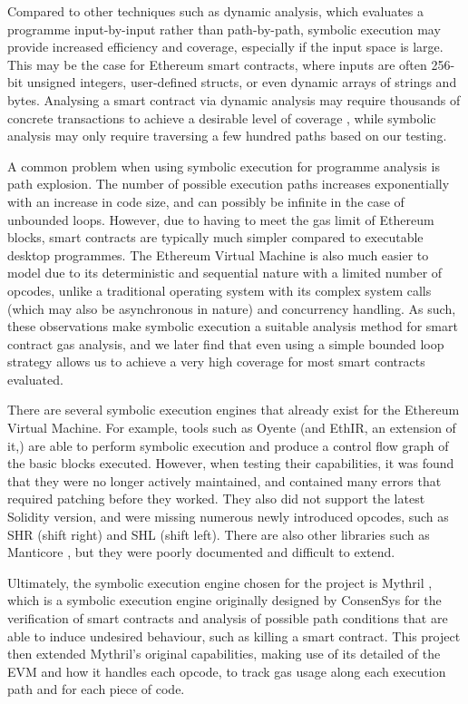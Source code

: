 Compared to other techniques such as dynamic analysis, which evaluates a programme 
input-by-input rather than path-by-path, symbolic execution may provide increased efficiency and
coverage, especially if the input space is large. This may be the case for Ethereum smart contracts,
where inputs are often 256-bit unsigned integers, user-defined structs, or even dynamic 
arrays of strings and bytes. Analysing a smart contract via dynamic analysis may require thousands of
concrete transactions to achieve a desirable level of coverage \cite{visualgas}, while symbolic analysis
may only require traversing a few hundred paths based on our testing. 

A common problem when using symbolic execution for programme analysis is path explosion. The number 
of possible execution paths increases exponentially with an increase in code size, and can possibly be
infinite in the case of unbounded loops. However, due to having to meet the gas limit of Ethereum blocks, 
smart contracts are typically much simpler compared to executable desktop programmes. The Ethereum 
Virtual Machine is also much easier to model due to its deterministic and sequential nature with a 
limited number of opcodes, unlike a traditional operating system with its complex system 
calls (which may also be asynchronous in nature) and concurrency handling. As such, these observations
make symbolic execution a suitable analysis method for smart contract gas analysis, and we later find that 
even using a simple bounded loop strategy allows us to achieve a very high coverage for most smart contracts
evaluated.

There are several symbolic execution engines that already exist for the Ethereum Virtual Machine.
For example, tools such as Oyente \cite{oyente} (and EthIR, an extension of it,) are able to perform symbolic execution and produce a 
control flow graph of the basic blocks executed. However, when testing their capabilities, it was found that they were no longer actively maintained,
and contained many errors that required patching before they worked. They also did not support the latest Solidity version, and were
missing numerous newly introduced opcodes, such as SHR (shift right) and SHL (shift left). There are also
other libraries such as Manticore \cite{manticore}, but they were poorly documented and difficult to extend.

Ultimately, the symbolic execution engine chosen for the project is Mythril \cite{mythril}, which is a symbolic 
execution engine originally designed by ConsenSys for the 
verification of smart contracts and analysis of possible path conditions that are able to
induce undesired behaviour, such as killing a smart contract. This project then extended Mythril's
original capabilities, making use of its detailed of the EVM and how it handles each opcode, 
to track gas usage along each execution path and for each piece of code.

